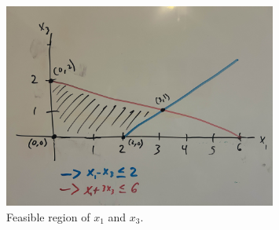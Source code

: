 \begin{figure}[htbp]
    \centering
    \includegraphics[width=0.8\textwidth]{../images/hw2.jpg}
    \caption{Feasible region of $x_1$ and $x_3$.}
    \label{fig:your_label}
\end{figure}
